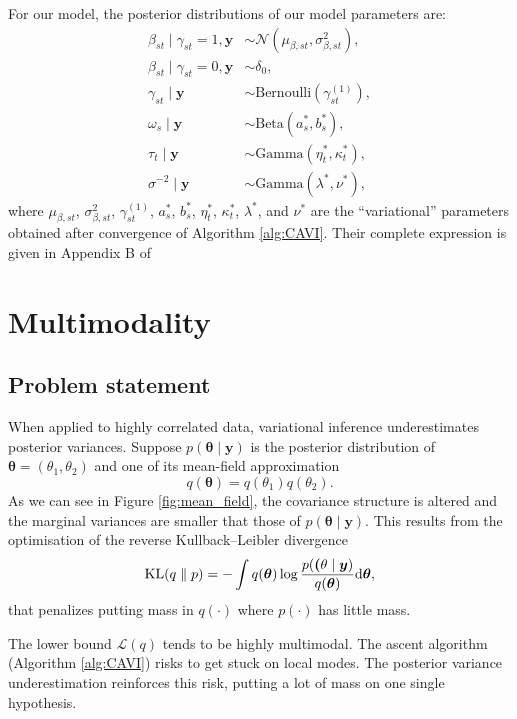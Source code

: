 \documentclass[a4paper, 11pt]{report}
\numberwithin{equation}{chapter}
\DeclareMathOperator*{\KL}{{\rm KL}}
\begin{document}
For our model, the posterior distributions of our model parameters are:
\begin{align*}
\beta_{st} \mid \gamma_{st} = 1, \boldsymbol{y} &\sim \mathcal{N}\left(\mu_{\beta, st},\sigma^2_{\beta, st}\right),\\
\beta_{st} \mid \gamma_{st} = 0, \boldsymbol{y} &\sim \delta_0,\\
\gamma_{st} \mid \boldsymbol{y} &\sim \text{Bernoulli}(\gamma_{st}^{(1)}),\\
\omega_s\mid\boldsymbol{y} &\sim \text{Beta}(a_s^*,b_s^*),\\
\tau_t\mid \boldsymbol{y} &\sim \text{Gamma}(\eta^*_t, \kappa^*_t),\\
\sigma^{-2} \mid \boldsymbol{y} &\sim \text{Gamma}(\lambda^*, \nu^*),
\end{align*}
where $\mu_{\beta,st}$, $\sigma^2_{\beta,st}$, $\gamma_{st}^{(1)}$, $a_s^*$, $b_s^*$, $\eta_t^*$, $\kappa_t^*$, $\lambda^*$, and $\nu^*$ are the ``variational'' parameters obtained after convergence of Algorithm \ref{alg:CAVI}. Their complete expression is given in Appendix B of \citep{helen}

\newpage
\chapter{Multimodality}
\section{Problem statement} \label{sec:pro_stat}
When applied to highly correlated data, variational inference underestimates posterior variances. Suppose $p(\boldsymbol{\theta} \mid \boldsymbol{y})$ is the posterior distribution of $\boldsymbol{\theta} = (\theta_1,\theta_2)$ and one of its mean-field approximation $$
q(\boldsymbol{\theta}) = q(\theta_1)q(\theta_2).
$$
As we can see in Figure \ref{fig:mean_field}, the covariance structure is altered and the marginal variances are smaller that those of $p(\boldsymbol{\theta} \mid \boldsymbol{y})$. This results from the optimisation of the reverse Kullback--Leibler divergence
$$
\KL (q\parallel p) = - \int q(\boldsymbol{\theta})\log\frac{p(\boldsymbol(\theta\mid\boldsymbol{y})}{q(\boldsymbol{\theta})}\mathrm{d}\boldsymbol{\theta},
$$
that penalizes putting mass in $q(\cdot)$ where $p(\cdot)$ has little mass.

The lower bound $\mathcal{L}(q)$ tends to be highly multimodal. The ascent algorithm (Algorithm \ref{alg:CAVI}) risks to get stuck on local modes. The posterior variance underestimation reinforces this risk, putting a lot of mass on one single hypothesis.
\end{document}
